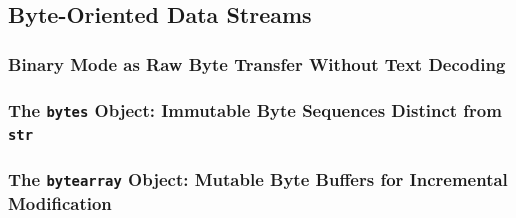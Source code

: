 \subsection{Byte-Oriented Data Streams}
\subsubsection{Binary Mode as Raw Byte Transfer Without Text Decoding}
\subsubsection{The \texttt{bytes} Object: Immutable Byte Sequences Distinct from \texttt{str}}
\subsubsection{The \texttt{bytearray} Object: Mutable Byte Buffers for Incremental Modification}
